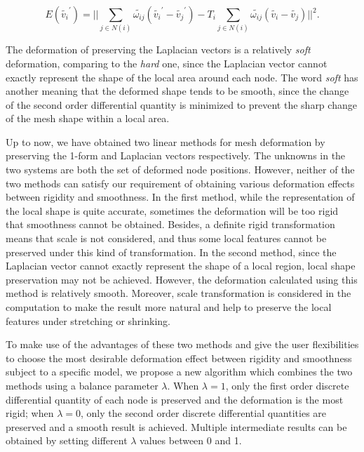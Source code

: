 \begin{equation}
\label{eq:edgelapenergy}
E(\tilde{v_i}^\prime)=||\sum\limits_{j\in N(i)}{\tilde{\omega_{ij}}(\tilde{v_i}^\prime - \tilde{v_j}^\prime)} -T_i\sum\limits_{j\in N(i)}{\tilde{\omega_{ij}}(\tilde{v_i} - \tilde{v_j})}||^2.
\end{equation}

The deformation of preserving the Laplacian vectors  is a relatively
\textit{soft} deformation, comparing to the \textit{hard} one, since the
Laplacian vector cannot exactly represent the shape of the local
area around each node. The word \textit{soft} has another meaning
that the deformed shape tends to be smooth, since the change of the
second order differential quantity is minimized to prevent the sharp
change of the mesh shape within a local area.

Up to now, we have obtained two linear methods for  mesh deformation
by preserving the 1-form and Laplacian vectors respectively. The
unknowns in the two systems are both the set of deformed node
positions. However, neither of the two methods can satisfy our
requirement of obtaining various deformation effects between
rigidity and smoothness. In the first method, while the
representation of the local shape is quite accurate, sometimes the
deformation will be too rigid that smoothness cannot be obtained.
Besides, a definite rigid transformation means that scale is not
considered, and thus some local features cannot be preserved under
this kind of transformation. In the second method, since the
Laplacian vector cannot exactly represent the shape of a local
region, local shape preservation may not be achieved. However, the
deformation calculated using this method is relatively smooth.
Moreover, scale transformation is considered in the computation to
make the result more natural and help to preserve the local features
under stretching or shrinking.

To make use of the advantages of these two methods and  give the
user flexibilities to choose the most desirable deformation effect
between rigidity and smoothness subject to a specific model, we
propose a new algorithm which combines the two methods using a
balance parameter $\lambda$. When $\lambda=1$, only the first order
discrete differential quantity of each node is preserved and the
deformation is the most rigid; when $\lambda=0$, only the second
order discrete differential quantities are preserved and a smooth
result is achieved. Multiple intermediate results can be obtained by
setting different $\lambda$ values between 0 and 1.

